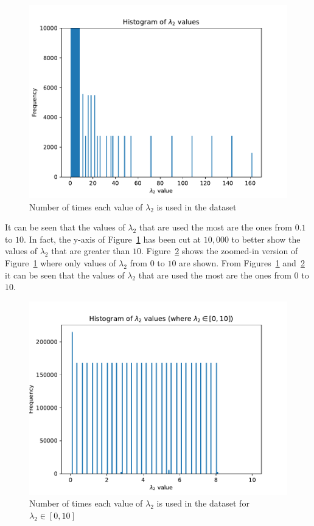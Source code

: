 \begin{figure}[H]
    \centering
    \includegraphics[width=\linewidth]{chapters/05_numerical_results/Bin/lambda_2_histogram.pdf}
    \caption{Number of times each value of \(\lambda_2\) is used in the dataset}
    \label{fig:data_description_lambda_2}
\end{figure}

It can be seen that the values of \(\lambda_2\) that are used the most are
the ones from \(0.1\) to \(10\).
In fact, the y-axis of Figure~\ref{fig:data_description_lambda_2} has been cut
at \(10,000\) to better show the values of \(\lambda_2\) that are greater than
\(10\).
Figure~\ref{fig:data_description_lambda_2_0_10} shows the zoomed-in version of
Figure~\ref{fig:data_description_lambda_2} where only values of \(\lambda_2\)
from \(0\) to \(10\) are shown.
From Figures~\ref{fig:data_description_lambda_2}
and~\ref{fig:data_description_lambda_2_0_10} it can be seen that the values of
\(\lambda_2\) that are used the most are the ones from \(0\) to \(10\).

\begin{figure}[H]
    \centering
    \includegraphics[width=\linewidth]{chapters/05_numerical_results/Bin/lambda_2_histogram_0_10.pdf}
    \caption{Number of times each value of \(\lambda_2\) is used in the dataset
        for \(\lambda_2 \in [0, 10]\)}
    \label{fig:data_description_lambda_2_0_10}
\end{figure}


